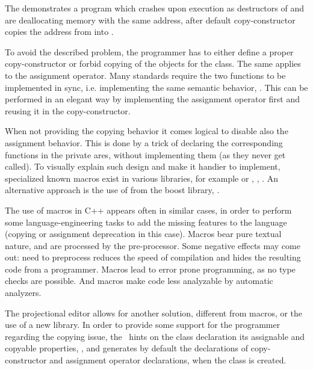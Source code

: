 
The  demonstrates a program which crashes upon execution as destructors of  and  are deallocating 
memory with the same address, after default copy-constructor copies the address from  into .

To avoid the described problem, the programmer has to either define a proper copy-constructor or forbid copying of the objects for
the class. The same applies to the assignment operator. Many standards require the two functions to be implemented in sync, i.e. 
implementing the same semantic behavior, \cite{ooocpp}. This can be performed in an elegant way by implementing the assignment 
operator first and reusing it in  the copy-constructor.

When not providing the copying behavior it comes logical to disable also the assignment behavior. 
This is done by a trick of declaring the corresponding functions in the private ares, without implementing them
(as they never get called). To visually explain such design and make it handier to implement, specialized known macros exist in 
various libraries, for example  or , \cite{googlecppstyle}, \cite{qobjref}.
An alternative approach is the use of  from the 
boost library, \cite{boost}.

The use of macros in C++ appears often in similar cases, in order to perform some language-engineering tasks to add the missing
features to the language (copying or assignment deprecation in this case). 
Macros bear pure textual nature, and are processed by the pre-processor. Some negative effects may 
come out: need to preprocess reduces the speed of compilation and hides the resulting code from a programmer. Macros lead
to error prone programming, as no type checks are possible. And macros make code less analyzable by automatic analyzers.



The projectional editor allows for another solution, different from macros, or the use of a new library.  
In order to provide some support for the  programmer regarding the copying issue, the \pcpp\ hints on the class declaration its 
assignable and copyable properties, , and generates by default the declarations of copy-constructor and assignment operator 
declarations, when the class is created.

